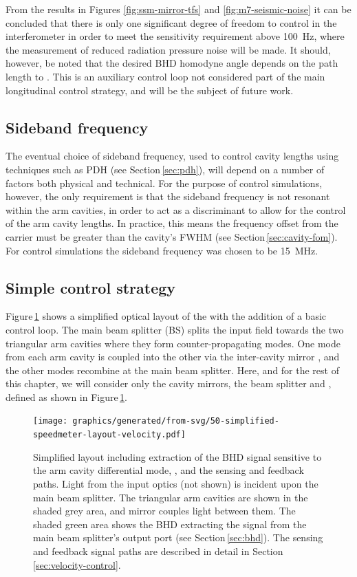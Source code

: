 From the results in Figures \ref{fig:ssm-mirror-tfs} and \ref{fig:m7-seismic-noise} it can be concluded that there is only one significant degree of freedom to control in the interferometer in order to meet the sensitivity requirement above \SI{100}{\hertz}, where the measurement of reduced radiation pressure noise will be made. It should, however, be noted that the desired \gls{BHD} homodyne angle depends on the path length \MELEVEN{} to \MSIXTEEN{}. This is an auxiliary control loop not considered part of the main longitudinal control strategy, and will be the subject of future work.

\subsection{Sideband frequency}
The eventual choice of sideband frequency, used to control cavity lengths using techniques such as \gls{PDH} (see Section\,\ref{sec:pdh}), will depend on a number of factors both physical and technical. For the purpose of control simulations, however, the only requirement is that the sideband frequency is not resonant within the arm cavities, in order to act as a discriminant to allow for the control of the arm cavity lengths. In practice, this means the frequency offset from the carrier must be greater than the cavity's \gls{FWHM} (see Section\,\ref{sec:cavity-fom}). For control simulations the sideband frequency was chosen to be \SI{15}{\mega\hertz}.

\subsection{\label{sec:velocity-control}Simple control strategy}
Figure\,\ref{fig:simplified-speedmeter-layout-velocity} shows a simplified optical layout of the \SSMEXPT{} with the addition of a basic control loop. The main beam splitter (BS) splits the input field towards the two triangular arm cavities where they form counter-propagating modes. One mode from each arm cavity is coupled into the other via the inter-cavity mirror \MINT{}, and the other modes recombine at the main beam splitter. Here, and for the rest of this chapter, we will consider only the cavity mirrors, the beam splitter and \MINT{}, defined as shown in Figure\,\ref{fig:simplified-speedmeter-layout-velocity}.

\begin{figure}
  \centering
  \texttt{[image: graphics/generated/from-svg/50-simplified-speedmeter-layout-velocity.pdf]}
  \caption[Simplified layout of the \SSMEXPT{} including a basic velocity feedback loop]{\label{fig:simplified-speedmeter-layout-velocity}Simplified \SSM{} layout including extraction of the BHD signal sensitive to the arm cavity differential mode, \LMINUS{}, and the sensing and feedback paths. Light from the input optics (not shown) is incident upon the main beam splitter. The triangular arm cavities are shown in the shaded grey area, and mirror \MINT{} couples light between them. The shaded green area shows the BHD extracting the signal from the main beam splitter's output port (see Section\,\ref{sec:bhd}). The sensing and feedback signal paths are described in detail in Section\,\ref{sec:velocity-control}.}
\end{figure}

